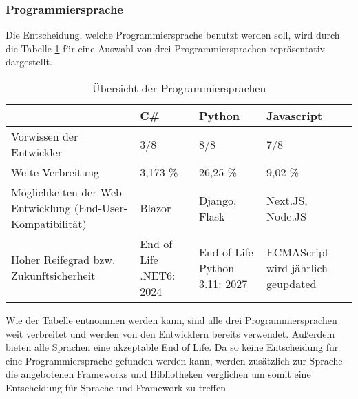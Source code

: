 \subsubsection*{Programmiersprache}

Die Entscheidung, welche Programmiersprache benutzt werden soll, wird durch die Tabelle \ref{tab:programming_languages} für eine Auswahl von drei Programmiersprachen repräsentativ dargestellt.

\begin{table}[H]
  \begin{tabular} {|m{3cm}|m{3cm}|m{3cm}|m{3cm}|}
    \hline
    & C\# & Python & Javascript \\
    \hline
    Vorwissen der Entwickler & 3/8 & 8/8 & 7/8 \\
    \hline
    Weite Verbreitung & 3,173 \%\cite{noauthor_github_nodate} & 26,25 \%\cite{noauthor_github_nodate} & 9,02 \%\cite{noauthor_github_nodate} \\
    \hline
    Möglichkeiten der Web-Entwicklung (End-User-Kompatibilität) & Blazor & Django, Flask & Next.JS, Node.JS \\
    \hline
    Hoher Reifegrad bzw. Zukunftsicherheit & End of Life .NET6: 2024\cite{noauthor_.net_nodate} & End of Life Python 3.11: 2027\cite{noauthor_python_nodate} & ECMAScript wird jährlich geupdated\cite{noauthor_javascript_nodate} \\
    \hline
  \end{tabular}
  \caption{Übersicht der Programmiersprachen}
  \label{tab:programming_languages}
\end{table}\noindent
Wie der Tabelle entnommen werden kann, sind alle drei Programmiersprachen weit verbreitet und werden von den Entwicklern bereits verwendet.
Außerdem bieten alle Sprachen eine akzeptable End of Life.
Da so keine Entscheidung für eine Programmiersprache gefunden werden kann, werden zusätzlich zur Sprache die angebotenen Frameworks und Bibliotheken verglichen um somit eine Entscheidung für Sprache und Framework zu treffen




